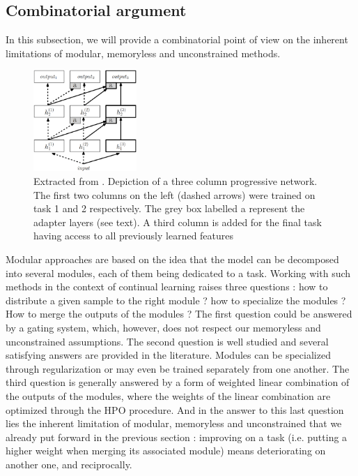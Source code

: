 \documentclass[11pt]{article}
\begin{document}
\subsection{Combinatorial argument}


In this subsection, we will provide a combinatorial point of view on the inherent limitations of modular, memoryless and unconstrained methods.

\begin{figure}
    \centering
    \includegraphics[width=0.35\textwidth]{images/PNN.png}
    \caption{Extracted from \cite{PNN}. Depiction of a three column progressive network. The first two columns on the left (dashed arrows) were trained on task 1 and 2 respectively. The grey box labelled a represent the adapter layers (see text). A third column is added for the final task having access to all previously learned features}
    \label{fig:PNN}
\end{figure}

\vspace{2mm}
\noindent
Modular approaches are based on the idea that the model can be decomposed into several modules, each of them being dedicated to a task. Working with such methods in the context of continual learning raises three questions : how to distribute a given sample to the right module ? how to specialize the modules ? How to merge the outputs of the modules ? The first question could be answered by a gating system, which, however, does not respect our memoryless and unconstrained assumptions. The second question is well studied and several satisfying answers are provided in the literature. Modules can be specialized through regularization or may even be trained separately from one another. The third question is generally answered by a form of weighted linear combination of the outputs of the modules, where the weights of the linear combination are optimized through the HPO procedure. And in the answer to this last question lies the inherent limitation of modular, memoryless and unconstrained that we already put forward in the previous section : improving on a task (i.e. putting a higher weight when merging its associated module) means deteriorating on another one, and reciprocally. 
\end{document}
